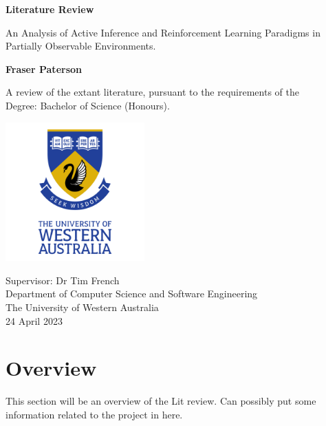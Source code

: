 \documentclass[onecolumn]{IEEEtran}
\begin{document}
\begin{titlepage}
	\begin{center}
	
	\vspace*{0.5cm}
	
	\Huge
	\textbf{Literature Review}
	
	\vspace{0.5cm}
	\Large
	An Analysis of Active Inference and Reinforcement Learning Paradigms in Partially Observable Environments.
	
	\vspace{1.5cm}

	\textbf{Fraser Paterson}

	\vspace{1.5cm}

	A review of the extant literature, pursuant to the requirements of the\\ 
	Degree: Bachelor of Science (Honours).  
	
	\vspace{2.0cm}

	\includegraphics[width=0.4\textwidth]{UWA_Logo.png}
	
	\vspace{2.0cm}	
	
	\Large
	Supervisor: Dr Tim French\\ 
	Department of Computer Science and Software Engineering\\
	The University of Western Australia\\
	24 April 2023
	\end{center}
\end{titlepage}


\tableofcontents

\cleardoublepage

\section{Overview}
This section will be an overview of the Lit review. Can possibly put some information related to the project in here.
\end{document}
